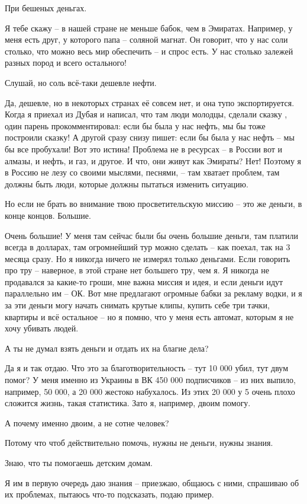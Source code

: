 При бешеных деньгах.

Я тебе скажу – в нашей стране не меньше бабок, чем в Эмиратах. Например, у меня
есть друг, у которого папа – соляной магнат. Он говорит, что у нас соли
столько, что можно весь мир обеспечить – и спрос есть. У нас столько залежей
разных пород и всего остального!

Слушай, но соль всё-таки дешевле нефти.

Да, дешевле, но в некоторых странах её совсем нет, и она тупо экспортируется.
Когда я приехал из Дубая и написал, что там люди молодцы, сделали сказку , один
парень прокомментировал: если бы была у нас нефть, мы бы тоже построили сказку!
А другой сразу снизу пишет: если бы была у нас нефть – мы бы все пробухали! Вот
это истина! Проблема не в ресурсах – в России вот и алмазы, и нефть, и газ, и
другое. И что, они живут как Эмираты? Нет! Поэтому я в Россию не лезу со своими
мыслями, песнями, – там хватает проблем, там должны быть люди, которые должны
пытаться изменить ситуацию.

Но если не брать во внимание твою просветительскую миссию – это же деньги, в
конце концов. Большие.

Очень большие! У меня там сейчас были бы очень большие деньги, там платили
всегда в долларах, там огромнейший тур можно сделать – как поехал, так на 3
месяца сразу. Но я никогда ничего не измерял только деньгами. Если говорить про
тру – наверное, в этой стране нет большего тру, чем я. Я никогда не продавался
за какие-то гроши, мне важна миссия и идея, и если деньги идут параллельно им –
ОК. Вот мне предлагают огромные бабки за рекламу водки, и я за эти деньги могу
начать снимать крутые клипы, купить себе три тачки, квартиры и всё остальное –
но я помню, что у меня есть автомат, которым я не хочу убивать людей.

А ты не думал взять деньги и отдать их на благие дела?

Да я и так отдаю. Что это за благотворительность – тут 10 000 убил, тут двум
помог? У меня именно из Украины в ВК 450 000 подписчиков – из них выпило,
например, 50 000, а 20 000 жестоко набухалось. Из этих 20 000 у 5 очень плохо
сложится жизнь, такая статистика. Зато я, например, двоим помогу.

А почему именно двоим, а не сотне человек?

Потому что чтоб действительно помочь, нужны не деньги, нужны знания.

Знаю, что ты помогаешь детским домам.

Я им в первую очередь даю знания – приезжаю, общаюсь с ними, спрашиваю об их
проблемах, пытаюсь что-то подсказать, подаю пример.

